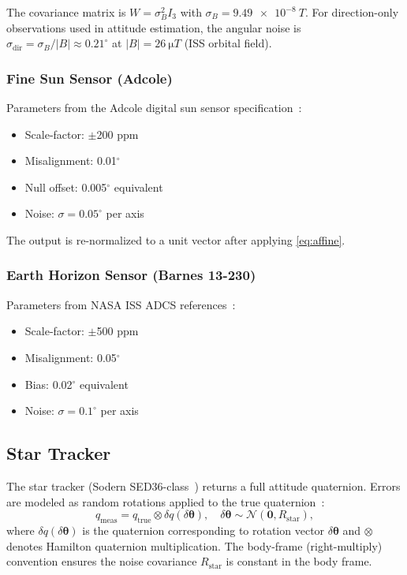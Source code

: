 \documentclass[conference]{IEEEtran}
\begin{document}
The covariance matrix is $W = \sigma_B^2 I_3$ with
$\sigma_B = \SI{9.49e-8}{T}$.  For direction-only observations used in
attitude estimation, the angular noise is
$\sigma_{\text{dir}} = \sigma_B / |B| \approx 0.21^\circ$ at
$|B| = \SI{26}{\micro T}$ (ISS orbital field).

\subsubsection{Fine Sun Sensor (Adcole)}

Parameters from the Adcole digital sun sensor specification~\cite{adcole}:
\begin{itemize}
  \item Scale-factor: $\pm$200 ppm
  \item Misalignment: 0.01$^\circ$
  \item Null offset: 0.005$^\circ$ equivalent
  \item Noise: $\sigma = 0.05^\circ$ per axis
\end{itemize}

The output is re-normalized to a unit vector after applying
\eqref{eq:affine}.

\subsubsection{Earth Horizon Sensor (Barnes 13-230)}

Parameters from NASA ISS ADCS references~\cite{smad}:
\begin{itemize}
  \item Scale-factor: $\pm$500 ppm
  \item Misalignment: 0.05$^\circ$
  \item Bias: 0.02$^\circ$ equivalent
  \item Noise: $\sigma = 0.1^\circ$ per axis
\end{itemize}

\subsection{Star Tracker}

The star tracker (Sodern SED36-class~\cite{sodern}) returns a full attitude
quaternion.  Errors are modeled as random rotations applied to the true
quaternion~\cite{markley2014}:
\begin{equation}
  q_{\text{meas}} = q_{\text{true}} \otimes \delta q(\delta\bm{\theta}),
  \quad \delta\bm{\theta} \sim \mathcal{N}(\bm{0}, R_{\text{star}}),
\end{equation}
where $\delta q(\delta\bm{\theta})$ is the quaternion corresponding to
rotation vector $\delta\bm{\theta}$ and $\otimes$ denotes Hamilton
quaternion multiplication.  The body-frame (right-multiply) convention
ensures the noise covariance $R_{\text{star}}$ is constant in the body frame.
\end{document}
